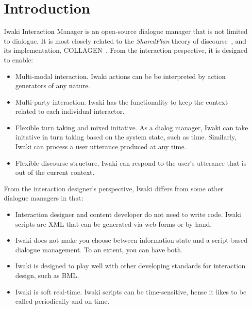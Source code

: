 \chapter{Introduction} %
\label{Chapter1}


Iwaki Interaction Manager is an open-source dialogue manager that is not limited to dialogue. It is most closely related to the \textsl{SharedPlan} theory of discourse~\citep{GrozsSidner1990,Lochbaum1998}, and its implementation, COLLAGEN~\citep{RichSidner1998}. From the interaction pespective, it is designed to enable:
\begin{itemize}
\item Multi-modal interaction. Iwaki actions can be be interpreted by action generators of any nature.
\item Multi-party interaction. Iwaki has the functionality to keep the context related to each individual interactor.
\item Flexible turn taking and mixed initative. As a dialog manager, Iwaki can take initative in turn taking based on the system state, such as time. Similarly, Iwaki can process a user utterance produced at any time.
\item Flexible discourse structure. Iwaki can respond to the user's utterance that is out of the current context.
\end{itemize}

From the interaction designer's perspective, Iwaki differs from some other dialogue managers in that:

\begin{itemize}
\item Interaction designer and content developer do not need to write code. Iwaki scripts are XML that can be generated via web forms or by hand.
\item Iwaki does not make you choose between information-state and a script-based dialogue management. To an extent, you can have both.
\item Iwaki is designed to play well with other developing standards for interaction design, such as BML.
\item Iwaki is soft real-time. Iwaki scripts can be time-sensitive, hense it likes to be called periodically and on time.
\end{itemize}

